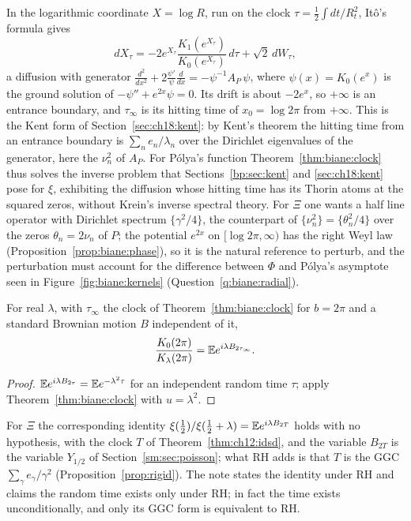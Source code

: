 In the logarithmic coordinate $X=\log R$, run on the clock $\tau=\frac12\int dt/R_t^2$, It\^o's formula gives
\[
dX_\tau=-2e^{X_\tau}\frac{K_1(e^{X_\tau})}{K_0(e^{X_\tau})}\,d\tau+\sqrt2\,dW_\tau,
\]
a diffusion with generator $\frac{d^2}{dx^2}+2\frac{\psi'}\psi\frac d{dx}=-\psi^{-1}A_P\,\psi$, where $\psi(x)=K_0(e^x)$ is the ground solution of $-\psi''+e^{2x}\psi=0$. Its drift is about $-2e^x$, so $+\infty$ is an entrance boundary, and $\tau_\infty$ is its hitting time of $x_0=\log2\pi$ from $+\infty$. This is the Kent form of Section~\ref{sec:ch18:kent}: by Kent's theorem \cite{Kent80} the hitting time from an entrance boundary is $\sum_ne_n/\lambda_n$ over the Dirichlet eigenvalues of the generator, here the $\nu_n^2$ of $A_P$. For P\'olya's function Theorem~\ref{thm:biane:clock} thus solves the inverse problem that Sections~\ref{bp:sec:kent} and \ref{sec:ch18:kent} pose for $\xi$, exhibiting the diffusion whose hitting time has its Thorin atoms at the squared zeros, without Krein's inverse spectral theory. For $\Xi$ one wants a half line operator with Dirichlet spectrum $\{\gamma^2/4\}$, the counterpart of $\{\nu_n^2\}=\{\theta_n^2/4\}$ over the zeros $\theta_n=2\nu_n$ of $P$; the potential $e^{2x}$ on $[\log2\pi,\infty)$ has the right Weyl law (Proposition~\ref{prop:biane:phase}), so it is the natural reference to perturb, and the perturbation must account for the difference between $\Phi$ and P\'olya's asymptote seen in Figure~\ref{fig:biane:kernels} (Question~\ref{q:biane:radial}).

\begin{corollary}\label{cor:biane:bm}
For real $\lambda$, with $\tau_\infty$ the clock of Theorem~\ref{thm:biane:clock} for $b=2\pi$ and a standard Brownian motion $B$ independent of it,
\[
\frac{K_0(2\pi)}{K_\lambda(2\pi)}=\mathbb{E} e^{i\lambda B_{2\tau_\infty}} .
\]
\end{corollary}

\begin{proof}
$\mathbb{E} e^{i\lambda B_{2\tau}}=\mathbb{E} e^{-\lambda^2\tau}$ for an independent random time $\tau$; apply Theorem~\ref{thm:biane:clock} with $u=\lambda^2$.
\end{proof}

For $\Xi$ the corresponding identity $\xi(\frac12)/\xi(\frac12+\lambda)=\mathbb{E} e^{i\lambda B_{2T}}$ holds with no hypothesis, with the clock $T$ of Theorem~\ref{thm:ch12:idsd}, and the variable $B_{2T}$ is the variable $Y_{1/2}$ of Section~\ref{sm:sec:poisson}; what RH adds is that $T$ is the GGC $\sum_\gamma e_\gamma/\gamma^2$ (Proposition~\ref{prop:rigid}). The note \cite{P26bia} states the identity under RH and claims the random time exists only under RH; in fact the time exists unconditionally, and only its GGC form is equivalent to RH.

